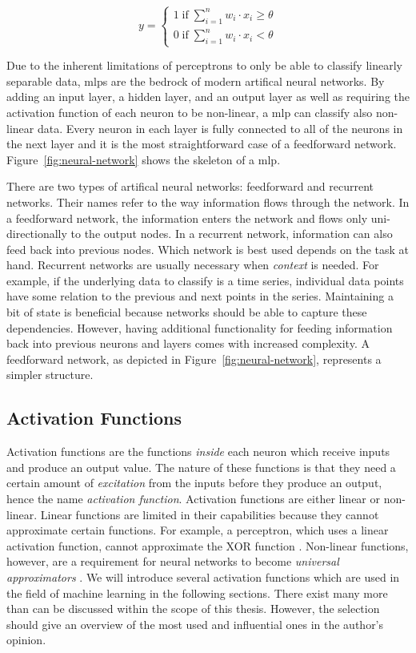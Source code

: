 \documentclass[final]{vutinfth} %
\begin{document}
\begin{equation}
  \label{eq:perceptron}
  y =
  \begin{cases}
    1\;\mathrm{if}\;\sum_{i=1}^{n}w_i\cdot x_i\geq\theta \\
    0\;\mathrm{if}\;\sum_{i=1}^{n}w_i\cdot x_i<\theta
  \end{cases}
\end{equation}

Due to the inherent limitations of perceptrons to only be able to
classify linearly separable data, \glspl{mlp} are the bedrock of
modern artifical neural networks. By adding an input layer, a hidden
layer, and an output layer as well as requiring the activation
function of each neuron to be non-linear, a \gls{mlp} can classify
also non-linear data. Every neuron in each layer is fully connected to
all of the neurons in the next layer and it is the most
straightforward case of a feedforward
network. Figure~\ref{fig:neural-network} shows the skeleton of a
\gls{mlp}.

There are two types of artifical neural networks: feedforward and
recurrent networks. Their names refer to the way information flows
through the network. In a feedforward network, the information enters
the network and flows only uni-directionally to the output nodes. In a
recurrent network, information can also feed back into previous
nodes. Which network is best used depends on the task at
hand. Recurrent networks are usually necessary when \emph{context} is
needed. For example, if the underlying data to classify is a time
series, individual data points have some relation to the previous and
next points in the series. Maintaining a bit of state is beneficial
because networks should be able to capture these
dependencies. However, having additional functionality for feeding
information back into previous neurons and layers comes with increased
complexity. A feedforward network, as depicted in
Figure~\ref{fig:neural-network}, represents a simpler structure.

\subsection{Activation Functions}
\label{ssec:theory-activation-functions}

Activation functions are the functions \emph{inside} each neuron which
receive inputs and produce an output value. The nature of these
functions is that they need a certain amount of \emph{excitation} from
the inputs before they produce an output, hence the name
\emph{activation function}. Activation functions are either linear or
non-linear. Linear functions are limited in their capabilities because
they cannot approximate certain functions. For example, a perceptron,
which uses a linear activation function, cannot approximate the XOR
function \cite{minsky2017}. Non-linear functions, however, are a
requirement for neural networks to become \emph{universal
approximators} \cite{hornik1989}. We will introduce several activation
functions which are used in the field of machine learning in the
following sections. There exist many more than can be discussed within
the scope of this thesis. However, the selection should give an
overview of the most used and influential ones in the author's
opinion.
\end{document}
